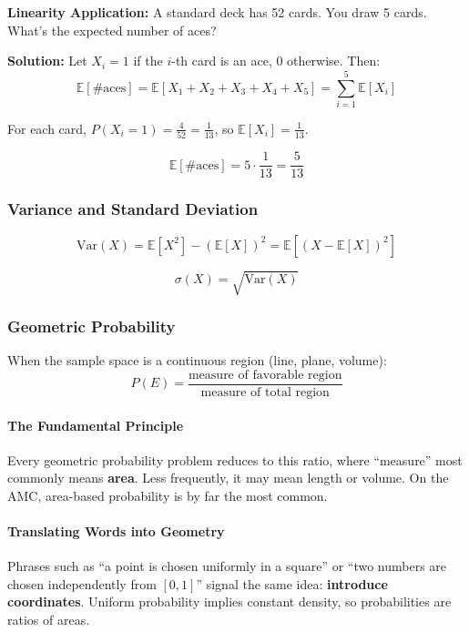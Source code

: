 \documentclass[12pt]{extarticle}
\begin{document}
\begin{examplebox}
\textbf{Linearity Application:} A standard deck has 52 cards. You draw 5 cards. What's the expected number of aces?

\textbf{Solution:} Let $X_i = 1$ if the $i$-th card is an ace, 0 otherwise. Then:
\[
\mathbb{E}[\text{\# aces}] = \mathbb{E}[X_1 + X_2 + X_3 + X_4 + X_5] = \sum_{i=1}^{5} \mathbb{E}[X_i]
\]

For each card, $P(X_i = 1) = \frac{4}{52} = \frac{1}{13}$, so $\mathbb{E}[X_i] = \frac{1}{13}$.

\[
\mathbb{E}[\text{\# aces}] = 5 \cdot \frac{1}{13} = \frac{5}{13}
\]
\end{examplebox}

\subsubsection{Variance and Standard Deviation}

\[
\text{Var}(X) = \mathbb{E}[X^2] - (\mathbb{E}[X])^2 = \mathbb{E}[(X - \mathbb{E}[X])^2]
\]

\[
\sigma(X) = \sqrt{\text{Var}(X)}
\]
\newpage
\subsubsection{Geometric Probability}

When the sample space is a continuous region (line, plane, volume):
\[
P(E) = \frac{\text{measure of favorable region}}{\text{measure of total region}}
\]

\paragraph{The Fundamental Principle}

Every geometric probability problem reduces to this ratio, where ``measure'' most commonly means \textbf{area}. Less frequently, it may mean length or volume. On the AMC, area-based probability is by far the most common.

\paragraph{Translating Words into Geometry}

Phrases such as ``a point is chosen uniformly in a square'' or ``two numbers are chosen independently from $[0,1]$'' signal the same idea: \textbf{introduce coordinates}. Uniform probability implies constant density, so probabilities are ratios of areas.
\end{document}
